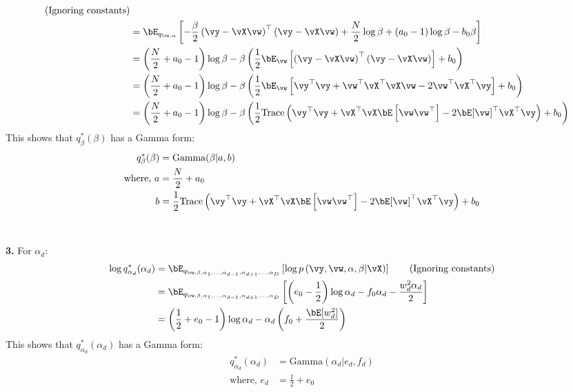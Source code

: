 \documentclass[a4paper,11pt]{article}
\begin{document}
\begin{pmisolution}
\begin{align*}
     \tag{Ignoring constants}
     \\
     &= \bE_{q_{\vw, \alpha}} \left[ - \frac{\beta}{2} \left(\vy - \vX\vw\right)^\top\left(\vy - \vX\vw\right) + \frac{N}{2} \log \beta +  (a_0 -1) \log \beta - b_0 \beta  \right] \\
     &= \left( \frac{N}{2} + a_0 - 1 \right) \log \beta - \beta \left( \frac{1}{2} \bE_{\vw}\left[ \left(\vy - \vX\vw\right)^\top\left(\vy - \vX\vw\right)  \right] + b_0 \right)\\
     &= \left( \frac{N}{2} + a_0 - 1 \right) \log \beta - \beta \left( \frac{1}{2} \bE_{\vw}\left[ \vy^\top\vy + \vw^\top\vX^\top\vX\vw - 2\vw^\top\vX^\top\vy  \right] + b_0 \right)\\
     &= \left( \frac{N}{2} + a_0 - 1 \right) \log \beta - \beta \left( \frac{1}{2} \text{Trace}\left(\vy^\top\vy + \vX^\top\vX\bE\left[\vw\vw^\top\right] - 2\bE[\vw]^\top\vX^\top\vy \right) + b_0 \right)\\
\end{align*}
This shows that $q_{\beta}^*(\beta)$ has a Gamma form:
\begin{align*}
    q_{\beta}^*(\beta) &= \text{Gamma}(\beta | a, b)\\
    \text{where, } a &= \frac{N}{2} + a_0\\
    b &= \frac{1}{2} \text{Trace}\left(\vy^\top\vy + \vX^\top\vX\bE\left[\vw\vw^\top\right] - 2\bE[\vw]^\top\vX^\top\vy \right) + b_0
\end{align*}
\\ \\
\noindent \textbf{3. } For $\alpha_d$:
\begin{align*}
    \log q_{\alpha_d}^*(\alpha_d) &= \bE_{q_{\vw, \beta, \alpha_1, \ldots, \alpha_{d-1}, \alpha_{d+1}, \ldots, \alpha_{D}}} \left[ \log p\left(\vy, \vw, \alpha, \beta| \vX\right) \right] \tag{Ignoring constants}
    \\
    &= \bE_{q_{\vw, \beta, \alpha_1, \ldots, \alpha_{d-1}, \alpha_{d+1}, \ldots, \alpha_{D}}} \left[ \left(e_0 - \frac{1}{2} \right) \log \alpha_d  - f_0 \alpha_d - \frac{w_d^2\alpha_d}{2}  \right]   \\
    &= \left(\frac{1}{2} + e_0 - 1 \right) \log \alpha_d - \alpha_d \left( f_0 +  \frac{\bE[w_d^2]}{2} \right) 
\end{align*}
This shows that $q_{\alpha_d}^*(\alpha_d)$ has a Gamma form: 
\begin{align*}
    q_{\alpha_d}^*(\alpha_d) &= \text{Gamma}(\alpha_d | e_d, f_d)\\
    \text{where, } e_d &=  \frac{1}{2} + e_0\\

\end{align*}
\end{pmisolution}
\end{document}
